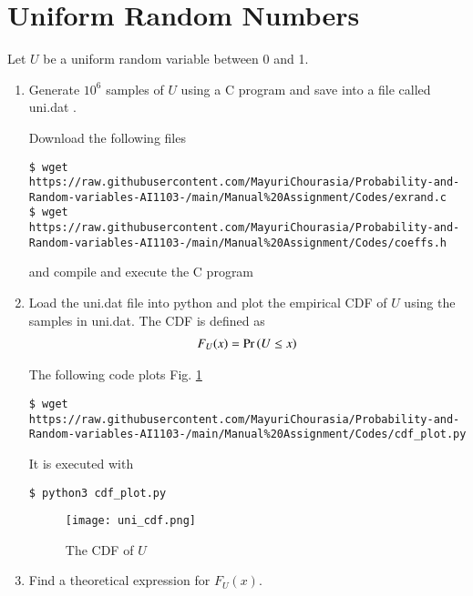 \documentclass[journal,12pt,twocolumn]{IEEEtran}
\renewcommand\thesection{\arabic{section}}
\begin{document}
\section{Uniform Random Numbers}
Let $U$ be a uniform random variable between 0 and 1.
\begin{enumerate}[label=\thesection.\arabic*
,ref=\thesection.\theenumi]
\item Generate $10^6$ samples of $U$ using a C program and save into a file called uni.dat .

\solution Download the following files
\begin{lstlisting}
$ wget https://raw.githubusercontent.com/MayuriChourasia/Probability-and-Random-variables-AI1103-/main/Manual%20Assignment/Codes/exrand.c
$ wget https://raw.githubusercontent.com/MayuriChourasia/Probability-and-Random-variables-AI1103-/main/Manual%20Assignment/Codes/coeffs.h
\end{lstlisting}
and compile and execute the C program

%
\item
Load the uni.dat file into python and plot the empirical CDF of $U$ using the samples in uni.dat. The CDF is defined as
\begin{align}
F_{U}(x) = \Pr\left(U \leq x\right)
\end{align}

\solution  The following code plots Fig. \ref{fig:uni_cdf}
\begin{lstlisting}
$ wget https://raw.githubusercontent.com/MayuriChourasia/Probability-and-Random-variables-AI1103-/main/Manual%20Assignment/Codes/cdf_plot.py
\end{lstlisting}
It is executed with
\begin{lstlisting}
$ python3 cdf_plot.py
\end{lstlisting}
\begin{figure}
\centering
\texttt{[image: uni\_cdf.png]}
\caption{The CDF of $U$}
\label{fig:uni_cdf}
\end{figure}

%
\item
Find a theoretical expression for $F_{U}(x)$.


\end{enumerate}
\end{document}
